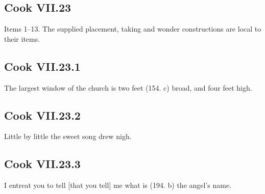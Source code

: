\subsection*{Cook VII.23}

Items 1–13. The supplied placement, taking and wonder constructions are local to their items.

\par\begin{minipage}{\linewidth}\raggedright
\subsection*{Cook VII.23.1}

The largest window of the church is two feet (154. c) broad, and four feet high.

\end{minipage}\par\addvspace{4pt}

\par\begin{minipage}{\linewidth}\raggedright
\subsection*{Cook VII.23.2}

Little by little the sweet song drew nigh.

\end{minipage}\par\addvspace{4pt}

\par\begin{minipage}{\linewidth}\raggedright
\subsection*{Cook VII.23.3}

I entreat you to tell [that you tell] me what is (194. b) the angel’s name.

\end{minipage}\par\addvspace{4pt}

